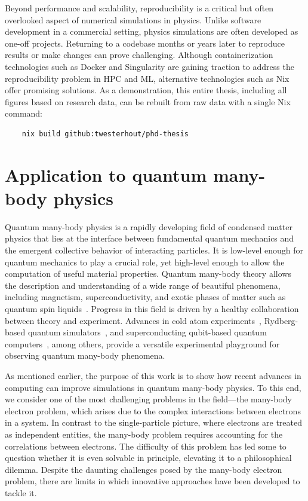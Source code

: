 Beyond performance and scalability, reproducibility is a critical but often overlooked aspect of numerical simulations in physics. Unlike software development in a commercial setting, physics simulations are often developed as one-off projects. Returning to a codebase months or years later to reproduce results or make changes can prove challenging. Although containerization technologies such as Docker and Singularity are gaining traction to address the reproducibility problem in HPC and ML, alternative technologies such as Nix~ offer promising solutions. As a demonstration, this entire thesis, including all figures based on research data, can be rebuilt from raw data with a single Nix command:
\begin{verbatim}
    nix build github:twesterhout/phd-thesis
\end{verbatim}

\section{Application to quantum many-body physics}

Quantum many-body physics is a rapidly developing field of condensed matter physics that lies at the interface between fundamental quantum mechanics and the emergent collective behavior of interacting particles. It is low-level enough for quantum mechanics to play a crucial role, yet high-level enough to allow the computation of useful material properties. Quantum many-body theory allows the description and understanding of a wide range of beautiful phenomena, including magnetism, superconductivity, and exotic phases of matter such as quantum spin liquids~\cite{Zhou_2017_Quantum_spin_li}. Progress in this field is driven by a healthy collaboration between theory and experiment. Advances in cold atom experiments~\cite{Gross_2017_Quantum_simulat}, Rydberg-based quantum simulators~\cite{Browae_2020_Many_body_physi}, and superconducting qubit-based quantum computers~\cite{Anders_2025_Thermalization}, among others, provide a versatile experimental playground for observing quantum many-body phenomena.

As mentioned earlier, the purpose of this work is to show how recent advances in computing can improve simulations in quantum many-body physics. To this end, we consider one of the most challenging problems in the field---the many-body electron problem, which arises due to the complex interactions between electrons in a system. In contrast to the single-particle picture, where electrons are treated as independent entities, the many-body problem requires accounting for the correlations between electrons. The difficulty of this problem has led some to question whether it is even solvable in principle, elevating it to a philosophical dilemma. Despite the daunting challenges posed by the many-body electron problem, there are limits in which innovative approaches have been developed to tackle it.

